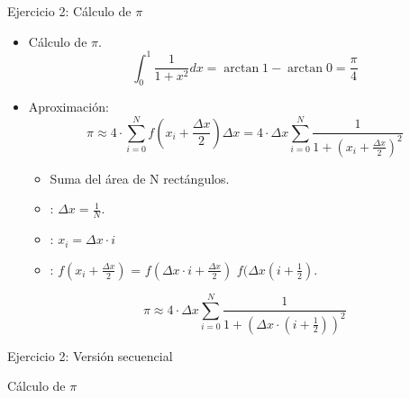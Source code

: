 \begin{frame}[t,shrink=20]{Ejercicio 2: Cálculo de $\pi$}
\begin{itemize}

  \item Cálculo de $\pi$.
\[
\int_{0}^{1} \frac{1}{1+x^2} dx =
\arctan{1} - \arctan{0} =
\frac{\pi}{4}
\]

  \item Aproximación:
\[
\pi \approx 4 \cdot \sum_{i=0}^{N} f(x_{i} + \frac{\Delta x}{2}) \Delta x =
4 \cdot \Delta x \sum_{i=0}^{N} \frac{1}{1 + (x_i + \frac{\Delta x}{2} )^2}
\]

    \begin{itemize}
      \item Suma del área de N rectángulos.
      \item {}: $\Delta x = \frac{1}{N}$.
      \item {}: $x_i = \Delta x \cdot i$
      \item {}: $f(x_i + \frac{\Delta x}{2})$ = $f(\Delta x \cdot i + \frac{\Delta x}{2})$
            $f(\Delta x (i + \frac{1}{2})$.
    \end{itemize}

\[
\pi \approx 
4 \cdot \Delta x \sum_{i=0}^{N} \frac{1}{1 + (\Delta x \cdot (i + \frac{1}{2} ))^2}
\]
\end{itemize}
\end{frame}

\begin{frame}[t]{Ejercicio 2: Versión secuencial}
\begin{block}{Cálculo de $\pi$}

\end{block}
\end{frame}

